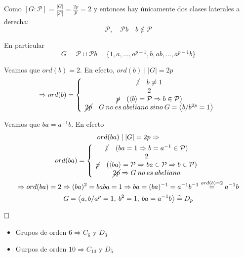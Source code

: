 \documentclass{article}
\begin{document}
\begin{enumerate}[(1)]
Como $\left[G:\mathcal{P}\right]=\frac{|G|}{|\mathcal{P}|}=\frac{2p}{p}=2$ y entonces hay únicamente dos clases laterales a derecha:
\begin{equation*}
\mathcal{P},\quad \mathcal{P}b\quad b\notin \mathcal{P}
\end{equation*}


En particular
\begin{equation*}
G=\mathcal{P}\cup \mathcal{P}b=\{1,a,\ldots,a^{p-1},b,ab,\ldots,a^{p-1}b\}
\end{equation*}

Veamos que $ord(b)=2$. En efecto, $ord(b)\mid |G|=2p$
\begin{equation*}
\Rightarrow ord(b)=\left\lbrace \begin{array}{c}
\cancel{1}\quad b\neq 1\\
2\\
\cancel{p}\quad (\left\langle b\right\rangle =\mathcal{P}\Rightarrow b\in \mathcal{P})\\
\cancel{2p}\quad G\:no\:es\:abeliano\:sino\:G=\left\langle b/b^{2p}=1\right\rangle
\end{array}\right.
\end{equation*}

Veamos que $ba=a^{-1}b$. En efecto
\begin{gather*}
ord(ba)\mid |G|=2p\Rightarrow \\
ord(ba)=\left\lbrace\begin{array}{c}
\cancel{1}\quad (ba=1\Rightarrow b=a^{-1}\in \mathcal{P})\\
2\\
\cancel{p}\quad (\left\langle ba\right\rangle =\mathcal{P}\Rightarrow ba\in \mathcal{P}\Rightarrow b\in \mathcal{P})\\
\cancel{2p}\Rightarrow G\:no\:es\:abeliano
\end{array}\right.\\
\Rightarrow ord(ba)=2\Rightarrow (ba)^2=baba=1\Rightarrow ba=(ba)^{-1}=a^{-1}b^{-1}\overset{ord(b)=2}{=}a^{-1}b\\
G=\left\langle a,b/a^p=1,\:b^2=1,\:ba=a^{-1}b\right\rangle \overset{\sim}{=} D_p
\end{gather*}

$\hfill\square$\\

\begin{itemize}
\item Grupos de orden $6\Rightarrow C_6$ y $D_3$

\item Gurpos de orden $10\Rightarrow C_{10}$ y $D_5$


\end{itemize}
\end{enumerate}
\end{document}
